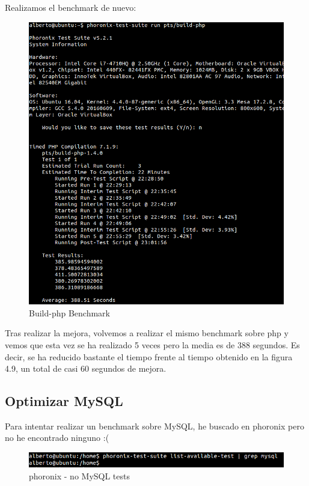 \newpage
Realizamos el benchmark de nuevo:

\begin{figure}[h]
	\centering
	\includegraphics[scale=0.45]{images/post2.png}
	\caption{Build-php Benchmark}
\end{figure} 
Tras realizar la mejora, volvemos a realizar el mismo benchmark sobre php y vemos que esta vez se ha realizado 5 veces pero la media es de 388 segundos. Es decir, se ha reducido bastante el tiempo frente al tiempo obtenido en la figura 4.9, un total de casi 60 segundos de mejora. \\




\newpage
\subsection{Optimizar MySQL}

Para intentar realizar un benchmark sobre MySQL, he buscado en phoronix pero no he encontrado ninguno :(

\begin{figure}[h]
	\centering
	\includegraphics[scale=0.35]{images/noresult.png}
	\caption{phoronix - no MySQL tests}
\end{figure} 

